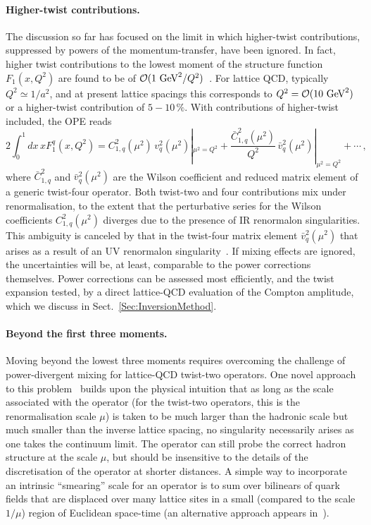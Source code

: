 \paragraph*{Higher-twist contributions.}
%
The discussion so far has focused on the limit in which higher-twist contributions, suppressed by powers of the momentum-transfer, have been ignored. In fact, higher twist contributions to the lowest moment of the structure function $F_1(x,Q^2)$ are found to be of ${\cal O}(1\mbox{ GeV}^2/Q^2)$~\cite{Blumlein:2008kz}.
%
For lattice QCD, typically $Q^2 \simeq 1/a^2$, and at present lattice spacings this corresponds to $Q^2 = {\cal O}(10\mbox{ GeV}^2)$ or a higher-twist contribution of $5 - 10\, \%$. With contributions of higher-twist included, the OPE reads
\begin{equation}
2 \int_0^1 dx\, x F_1^q(x,Q^2) = C_{1,q}^2(\mu^2)\, v_q^2(\mu^2)|_{\mu^2=Q^2} + \frac{\bar{C}_{1,q}^2(\mu^2)}{Q^2}\, \bar{v}_q^2(\mu^2)|_{\mu^2=Q^2} + \cdots \,,
\label{tex}
\end{equation}
where $\bar{C}_{1,q}^2$ and $\bar{v}_q^2(\mu^2)$ are the Wilson coefficient and reduced matrix element of a generic twist-four operator. Both twist-two and four contributions mix under renormalisation, to the extent that the perturbative series for the Wilson coefficients $C_{1,q}^2(\mu^2)$ diverges due to the presence of IR renormalon singularities.
%
This ambiguity is canceled by that in the twist-four matrix element $\bar{v}_q^2(\mu^2)$ that arises as a result of an UV renormalon singularity~\cite{Martinelli:1996pk}. If mixing effects are ignored, the uncertainties will be, at least, comparable to the power corrections themselves.
%
Power corrections can be assessed most efficiently, and the twist expansion tested, by a direct lattice-QCD evaluation of the Compton amplitude, which we discuss in Sect.~\ref{Sec:InversionMethod}.

\paragraph*{Beyond the first three moments.}
%
Moving beyond the lowest three moments requires overcoming the challenge of power-divergent mixing for lattice-QCD twist-two operators.
%
One novel approach to this problem~\cite{Davoudi:2012ya} builds upon the physical intuition that as long as the scale associated with the operator (for the twist-two operators, this is the renormalisation scale $\mu$) is taken to be much larger than the hadronic scale but much smaller than the inverse lattice spacing, no singularity necessarily arises as one takes the continuum limit.
%
The operator can still probe the correct hadron structure at the scale $\mu$, but should be insensitive to the details of the discretisation of the operator at shorter distances.
%
A simple way to incorporate an intrinsic ``smearing'' scale for an operator is to sum over bilinears of quark fields that are displaced over many lattice sites in a small (compared to the scale $1/\mu$) region of Euclidean space-time (an alternative approach appears in~\cite{Monahan:2015lha}).


